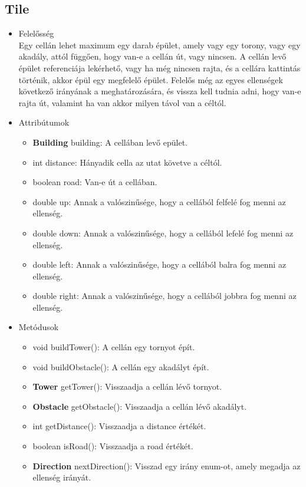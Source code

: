 \subsection{Tile}
\begin{itemize}
\item Felelősség\\
Egy cellán lehet maximum egy darab épület, amely vagy egy torony, vagy egy akadály, attól függően, hogy van-e a cellán út, vagy nincsen. A cellán levő épület referenciája lekérhető, vagy ha még nincsen rajta, és a cellára kattintás történik, akkor épül egy megfelelő épület. Felelős még az egyes ellenségek következő irányának a meghatározására, és vissza kell tudnia adni, hogy van-e rajta út, valamint ha van akkor milyen távol van a céltól.
\item Attribútumok
	\begin{itemize}
		\item \textbf{Building} building: A cellában levő epület.
		\item int distance: Hányadik cella az utat követve a céltól.
		\item boolean road: Van-e út a cellában.
		\item double up: Annak a valószinűsége, hogy a cellából felfelé fog menni az ellenség.
		\item double down: Annak a valószinűsége, hogy a cellából lefelé fog menni az ellenség.
		\item double left: Annak a valószinűsége, hogy a cellából balra fog menni az ellenség.
		\item double right: Annak a valószinűsége, hogy a cellából jobbra fog menni az ellenség.
	\end{itemize}
\item Metódusok
	\begin{itemize}
		\item void buildTower(): A cellán egy tornyot épít.
		\item void buildObstacle(): A cellán egy akadályt épít.
		\item \textbf{Tower} getTower(): Visszaadja a cellán lévő tornyot.
		\item \textbf{Obstacle} getObstacle(): Visszaadja a cellán lévő akadályt.
		\item int getDistance(): Visszaadja a distance értékét.
		\item boolean isRoad(): Visszaadja a road értékét.
		\item \textbf{Direction} nextDirection(): Visszad egy irány enum-ot, amely megadja az ellenség irányát.
	\end{itemize}
\end{itemize}



